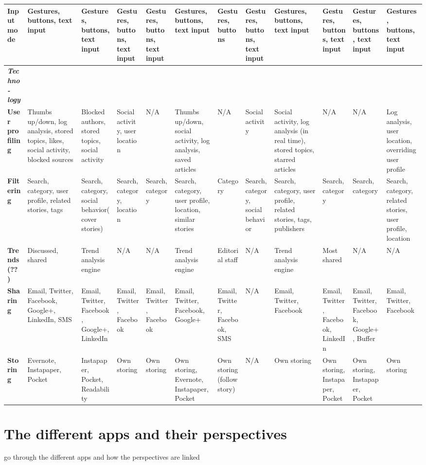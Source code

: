 \begin{landscape}
\begin{center}
\begin{longtable}{ | p{1.6cm} | p{1.6cm} | p{1.6cm} | p{1.6cm} | p{1.6cm} | p{1.6cm} | p{1.6cm} | p{1.6cm} | p{1.6cm} | p{1.6cm} | p{1.6cm} | p{1.6cm} |}
\textbf{Input mode} & Gestures, buttons, text input & Gestures, buttons, text input & Gestures, buttons, text input & Gestures, buttons, text input & Gestures, buttons, text input & Gestures, buttons & Gestures, buttons, text input & Gestures, buttons, text input & Gestures, buttons, text input & Gestures, buttons, text input & Gestures, buttons, text input \\ \hline

\textit{\textbf{Techno-logy}} &&&&&&&&&&& \\ \hline

\textbf{User profiling} & Thumbs up/down, log analysis, stored topics, likes, social activity, blocked sources & Blocked authors, stored topics, social activity & Social activity, user location & N/A & Thumbs up/down, social activity, log analysis, saved articles & N/A & Social activity & Social activity, log analysis (in real time), stored topics, starred articles & N/A & N/A & Log analysis, user location, overriding user profile \\ \hline

\textbf{Filtering} & Search, category, user profile, related stories, tags & Search, category, social behavior(cover stories) & Search, category, location & Search, category & Search, category, user profile, location, similar stories & Category & Search, category, social behavior & Search, category, user profile, related stories, tags, publishers & Search, category & Search, category & Search, category, related stories, user profile, location  \\ \hline

\textbf{Trends (??)} & Discussed, shared & Trend analysis engine & N/A & N/A & Trend analysis engine & Editorial staff & N/A & Trend analysis engine & Most shared & N/A & N/A\\ \hline

\textbf{Sharing} & Email, Twitter, Facebook, Google+, LinkedIn, SMS & Email, Twitter, Facebook, Google+, LinkedIn & Email, Twitter, Facebook & Email, Twitter, Facebook & Email, Twitter, Facebook, Google+ & Email, Twitter, Facebook, SMS & N/A & Email, Twitter, Facebook & Email, Twitter, Facebook, LinkedIn & Email, Twitter, Facebook, Google+, Buffer & Email, Twitter, Facebook \\ \hline

\textbf{Storing} & Evernote, Instapaper, Pocket & Instapaper, Pocket, Readability & Own storing & Own storing & Own storing, Evernote, Instapaper, Pocket & Own storing (follow story) & N/A & Own storing & Own storing, Instapaper, Pocket & Own storing, Instapaper, Pocket & Own storing \\ \hline

\end{longtable}
\end{center}
\end{landscape}


\section{The different apps and their perspectives}

go through the different apps and how the perspectives are linked
